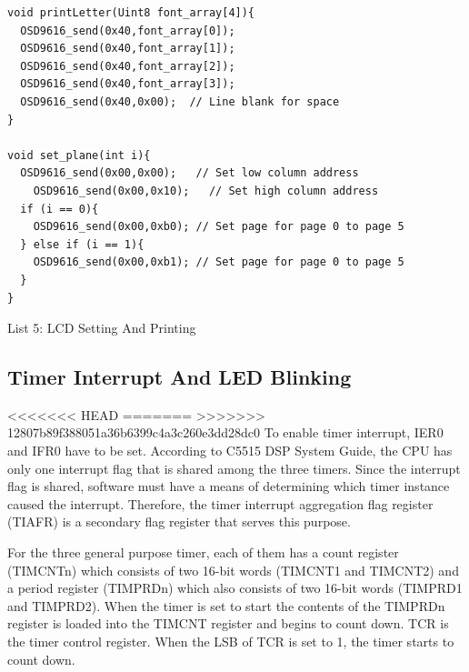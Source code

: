 \documentclass[titlepage]{article}
\begin{document}
\begin{listing}
\begin{verbatim}
void printLetter(Uint8 font_array[4]){
  OSD9616_send(0x40,font_array[0]);
  OSD9616_send(0x40,font_array[1]);
  OSD9616_send(0x40,font_array[2]);
  OSD9616_send(0x40,font_array[3]);
  OSD9616_send(0x40,0x00);  // Line blank for space
}

void set_plane(int i){
  OSD9616_send(0x00,0x00);   // Set low column address
    OSD9616_send(0x00,0x10);   // Set high column address
  if (i == 0){
    OSD9616_send(0x00,0xb0); // Set page for page 0 to page 5
  } else if (i == 1){
    OSD9616_send(0x00,0xb1); // Set page for page 0 to page 5
  }
}
\end{verbatim}
\centering
\caption{List 5: LCD Setting And Printing}
\newline
\end{listing}

\subsection{Timer Interrupt And LED Blinking}
<<<<<<< HEAD
\label{sec:orge78de37}
=======
\label{sec:orgbd86568}
>>>>>>> 12807b89f388051a36b6399c4a3c260e3dd28dc0
To enable timer interrupt, IER0 and IFR0 have to be set. According to C5515
DSP System Guide, the CPU has only one interrupt flag that is shared among
the three timers. Since the interrupt flag is shared, software must have a
means of determining which timer instance caused the interrupt. Therefore,
the timer interrupt aggregation flag register (TIAFR) is a secondary flag
register that serves this purpose.

For the three general purpose timer, each of them has a count register
(TIMCNTn) which consists of two 16-bit words (TIMCNT1 and TIMCNT2) and a
period register (TIMPRDn) which also consists of two 16-bit words (TIMPRD1
and TIMPRD2). When the timer is set to start the contents of the TIMPRDn
register is loaded into the TIMCNT register and begins to count down. TCR is
the timer control register. When the LSB of TCR is set to 1, the timer starts
to count down.
\end{document}
